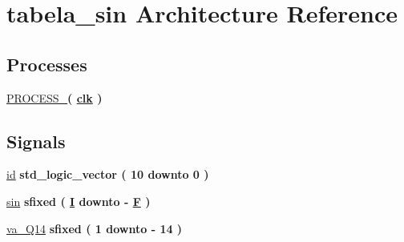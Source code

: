 \hypertarget{classtabela__sin_1_1tabela__sin}{}\section{tabela\+\_\+sin Architecture Reference}
\label{classtabela__sin_1_1tabela__sin}
\subsection*{Processes}
 \begin{DoxyCompactItemize}
\item 
\hyperlink{classtabela__sin_1_1tabela__sin_a7bc9a0c64529b658f4ba141aaa234427}{P\+R\+O\+C\+E\+S\+S\+\_}{\bfseries  ( {\bfseries {\bfseries \hyperlink{classtabela__sin_a4a4609c199d30b3adebbeb3a01276ec5}{clk}} \textcolor{vhdlchar}{ }} )}
\end{DoxyCompactItemize}
\subsection*{Signals}
 \begin{DoxyCompactItemize}
\item 
\hyperlink{classtabela__sin_1_1tabela__sin_a41a548b528ac841c76442d29dfb0838a}{id} {\bfseries \textcolor{comment}{std\+\_\+logic\+\_\+vector}\textcolor{vhdlchar}{ }\textcolor{vhdlchar}{(}\textcolor{vhdlchar}{ }\textcolor{vhdlchar}{ } \textcolor{vhdldigit}{10} \textcolor{vhdlchar}{ }\textcolor{keywordflow}{downto}\textcolor{vhdlchar}{ }\textcolor{vhdlchar}{ } \textcolor{vhdldigit}{0} \textcolor{vhdlchar}{ }\textcolor{vhdlchar}{)}\textcolor{vhdlchar}{ }} 
\item 
\hyperlink{classtabela__sin_1_1tabela__sin_a1fe5e5a2ba1da85ad8c40a313351a3a5}{sin} {\bfseries \textcolor{comment}{sfixed}\textcolor{vhdlchar}{ }\textcolor{vhdlchar}{(}\textcolor{vhdlchar}{ }\textcolor{vhdlchar}{ }\textcolor{vhdlchar}{ }\textcolor{vhdlchar}{ }{\bfseries \hyperlink{classtabela__sin_abb7ce405d45a733b6db94314a4f791fd}{I}} \textcolor{vhdlchar}{ }\textcolor{keywordflow}{downto}\textcolor{vhdlchar}{ }\textcolor{vhdlchar}{-\/}\textcolor{vhdlchar}{ }\textcolor{vhdlchar}{ }\textcolor{vhdlchar}{ }{\bfseries \hyperlink{classtabela__sin_aac2d6825f96b21ae984648cc93554339}{F}} \textcolor{vhdlchar}{ }\textcolor{vhdlchar}{)}\textcolor{vhdlchar}{ }} 
\item 
\hyperlink{classtabela__sin_1_1tabela__sin_a008ca4c78c7dea76719a666c8e8ec3b8}{va\+\_\+\+Q14} {\bfseries \textcolor{comment}{sfixed}\textcolor{vhdlchar}{ }\textcolor{vhdlchar}{(}\textcolor{vhdlchar}{ }\textcolor{vhdlchar}{ } \textcolor{vhdldigit}{1} \textcolor{vhdlchar}{ }\textcolor{keywordflow}{downto}\textcolor{vhdlchar}{ }\textcolor{vhdlchar}{-\/}\textcolor{vhdlchar}{ } \textcolor{vhdldigit}{14} \textcolor{vhdlchar}{ }\textcolor{vhdlchar}{)}\textcolor{vhdlchar}{ }} 
\end{DoxyCompactItemize}


